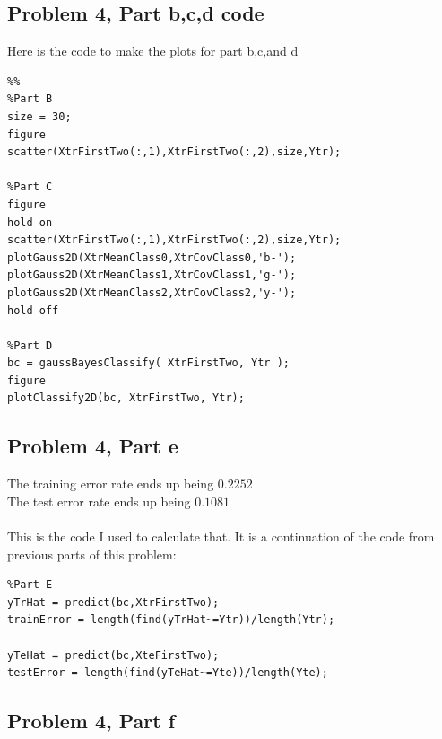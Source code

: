 \documentclass[11pt,psfig]{article}
\begin{document}
\newpage

\subsection*{Problem 4, Part b,c,d code}

Here is the code to make the plots for part b,c,and d
\begin{verbatim}
%%
%Part B
size = 30;
figure
scatter(XtrFirstTwo(:,1),XtrFirstTwo(:,2),size,Ytr);

%Part C
figure
hold on
scatter(XtrFirstTwo(:,1),XtrFirstTwo(:,2),size,Ytr);
plotGauss2D(XtrMeanClass0,XtrCovClass0,'b-');
plotGauss2D(XtrMeanClass1,XtrCovClass1,'g-');
plotGauss2D(XtrMeanClass2,XtrCovClass2,'y-');
hold off

%Part D
bc = gaussBayesClassify( XtrFirstTwo, Ytr );
figure
plotClassify2D(bc, XtrFirstTwo, Ytr);
\end{verbatim}

\subsection*{Problem 4, Part e}

The training error rate ends up being $0.2252$\\
The test error rate ends up being $0.1081$\\
\\
This is the code I used to calculate that. It is a continuation of the code from previous parts of this problem:
\begin{verbatim}
%Part E
yTrHat = predict(bc,XtrFirstTwo);
trainError = length(find(yTrHat~=Ytr))/length(Ytr);

yTeHat = predict(bc,XteFirstTwo);
testError = length(find(yTeHat~=Yte))/length(Yte);
\end{verbatim}

\newpage

\subsection*{Problem 4, Part f}
\end{document}
